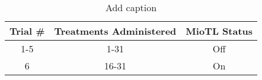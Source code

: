 \begin{table}[h!]
\centering
\caption{Add caption}
	\color{red}
	\begin{tabular}{|c|c|c|}
		\hline
		Trial # & Treatments Administered & MioTL Status \\
		\hline
		1-5 & 1-31 & Off \\
		\hline
		6 & 16-31 & On \\
		\hline
	\end{tabular}
\label{addlabel}
\end{table}